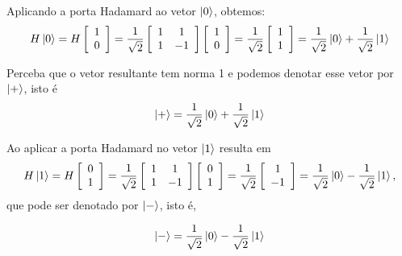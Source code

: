 Aplicando a porta Hadamard ao vetor $\ket{0}$, obtemos:
$$
    \label{eq:aplicacao_hadamard_0}
    H\ket{0}=H\left[\begin{array}{c}
            1 \\
            0
    \end{array}\right] = \dfrac{1}{\sqrt{2}}\left[\begin{array}{cc}
            1 & 1 \\
            1 & -1
    \end{array}\right]\left[\begin{array}{c}
            1 \\
            0
    \end{array}\right]=\dfrac{1}{\sqrt{2}}\left[\begin{array}{c}
            1 \\
            1
    \end{array}\right]=\dfrac{1}{\sqrt{2}}\ket{0}+\dfrac{1}{\sqrt{2}}\ket{1}
$$
    
Perceba que o vetor resultante tem norma 1 e podemos denotar esse vetor por $\ket{+}$, isto é
    $$
        \label{eq:ket_mais}
        \ket{+}=\dfrac{1}{\sqrt{2}}\ket{0}+\dfrac{1}{\sqrt{2}}\ket{1}
    $$
    
    Ao aplicar a porta Hadamard no vetor $\ket{1}$ resulta em
    $$
        \label{eq:aplicacao_hadamard_1}
        H\ket{1}=H\left[\begin{array}{c}
             0\\
             1
        \end{array}\right] = \dfrac{1}{\sqrt{2}}\left[\begin{array}{cc}
             1 & 1 \\
             1 & -1
        \end{array}\right]\left[\begin{array}{c}
             0\\
             1
        \end{array}\right]=\dfrac{1}{\sqrt{2}}\left[\begin{array}{c}
             1 \\
             -1
        \end{array}\right]=\dfrac{1}{\sqrt{2}}\ket{0}-\dfrac{1}{\sqrt{2}}\ket{1},
    $$
que pode ser denotado por $\ket{-}$, isto é, 

    $$
        \ket{-}=\dfrac{1}{\sqrt{2}}\ket{0}-\dfrac{1}{\sqrt{2}}\ket{1}
    $$
    
